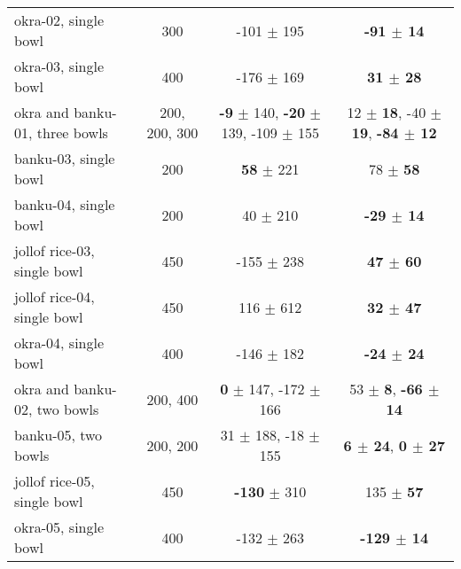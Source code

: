 \documentclass[journal]{IEEEtran}
\begin{document}
\begin{table}[!]
{\begin{tabular}{@{}lccc@{}}
okra-02, single bowl           & 300           & -101 $\pm$ 195                                           & \textbf{-91 $\pm$ 14}                                  \\
okra-03, single bowl           & 400           & -176 $\pm$ 169                                           & \textbf{31 $\pm$ 28}                                  \\
okra and banku-01, three bowls & 200, 200, 300 & \textbf{-9} $\pm$ 140, \textbf{-20} $\pm$ 139, -109 $\pm$ 155                          & 12 $\pm$ \textbf{18}, -40 $\pm$ \textbf{19}, \textbf{-84 $\pm$ 12}                   \\ \midrule
banku-03, single bowl          & 200           & \textbf{58} $\pm$ 221                                           & 78 $\pm$ \textbf{58}                                   \\
banku-04, single bowl          & 200           & 40 $\pm$ 210                                              & \textbf{-29 $\pm$ 14}                                  \\
jollof rice-03, single bowl    & 450           & -155 $\pm$ 238                                           & \textbf{47 $\pm$ 60}                                   \\
jollof rice-04, single bowl    & 450           & 116 $\pm$ 612                                            & \textbf{32 $\pm$ 47}                                   \\
okra-04, single bowl           & 400           & -146 $\pm$ 182                                           & \textbf{-24 $\pm$ 24}                                  \\
okra and banku-02, two bowls   & 200, 400      & \textbf{0} $\pm$ 147, -172 $\pm$ 166                                    & 53 $\pm$ \textbf{8}, \textbf{-66 $\pm$ 14}                            \\ \midrule
banku-05, two bowls            & 200, 200      & 31 $\pm$ 188, -18 $\pm$ 155                                   & \textbf{6 $\pm$ 24}, \textbf{0 $\pm$ 27}                              \\
jollof rice-05, single bowl    & 450           & \textbf{-130} $\pm$ 310                                           & 135 $\pm$ \textbf{57}                                   \\
okra-05, single bowl           & 400           & -132 $\pm$ 263                                           & \textbf{-129 $\pm$ 14}                                 \\

\end{tabular}}
\end{table}
\end{document}
